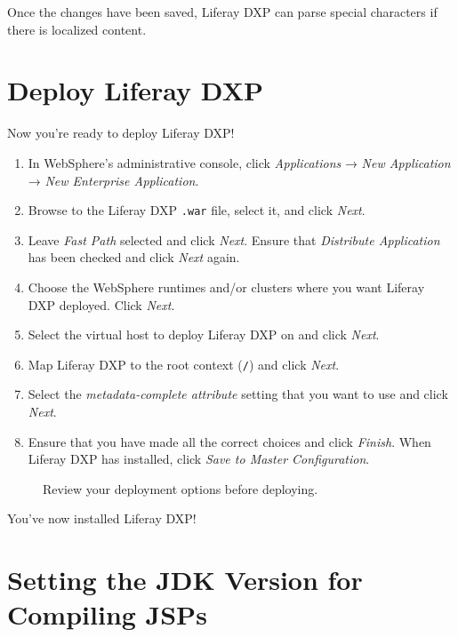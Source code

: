 Once the changes have been saved, Liferay DXP can parse special
characters if there is localized content.

\section{Deploy Liferay DXP}\label{deploy-liferay-dxp}

Now you're ready to deploy Liferay DXP!

\begin{enumerate}
\def\labelenumi{\arabic{enumi}.}
\item
  In WebSphere's administrative console, click \emph{Applications} →
  \emph{New Application} → \emph{New Enterprise Application}.
\item
  Browse to the Liferay DXP \texttt{.war} file, select it, and click
  \emph{Next}.
\item
  Leave \emph{Fast Path} selected and click \emph{Next}. Ensure that
  \emph{Distribute Application} has been checked and click \emph{Next}
  again.
\item
  Choose the WebSphere runtimes and/or clusters where you want Liferay
  DXP deployed. Click \emph{Next}.
\item
  Select the virtual host to deploy Liferay DXP on and click
  \emph{Next}.
\item
  Map Liferay DXP to the root context (\texttt{/}) and click
  \emph{Next}.
\item
  Select the \emph{metadata-complete attribute} setting that you want to
  use and click \emph{Next}.
\item
  Ensure that you have made all the correct choices and click
  \emph{Finish}. When Liferay DXP has installed, click \emph{Save to
  Master Configuration}.
\end{enumerate}

\begin{figure}
\centering
{}
\caption{Review your deployment options before deploying.}
\end{figure}

You've now installed Liferay DXP!

\section{Setting the JDK Version for Compiling
JSPs}\label{setting-the-jdk-version-for-compiling-jsps}

